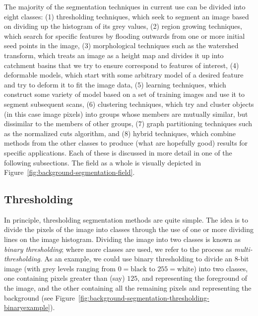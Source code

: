 The majority of the segmentation techniques in current use can be divided into eight classes: (1) thresholding techniques, which seek to segment an image based on dividing up the histogram of its grey values, (2) region growing techniques, which search for specific features by flooding outwards from one or more initial seed points in the image, (3) morphological techniques such as the watershed transform, which treats an image as a height map and divides it up into catchment basins that we try to ensure correspond to features of interest, (4) deformable models, which start with some arbitrary model of a desired feature and try to deform it to fit the image data, (5) learning techniques, which construct some variety of model based on a set of training images and use it to segment subsequent scans, (6) clustering techniques, which try and cluster objects (in this case image pixels) into groups whose members are mutually similar, but dissimilar to the members of other groups, (7) graph partitioning techniques such as the normalized cuts algorithm, and (8) hybrid techniques, which combine methods from the other classes to produce (what are hopefully good) results for specific applications. Each of these is discussed in more detail in one of the following subsections. The field as a whole is visually depicted in Figure~\ref{fig:background-segmentation-field}.


\subsection{Thresholding}

In principle, thresholding segmentation methods are quite simple. The idea is to divide the pixels of the image into classes through the use of one or more dividing lines on the image histogram. Dividing the image into two classes is known as \emph{binary thresholding}; where more classes are used, we refer to the process as \emph{multi-thresholding}. As an example, we could use binary thresholding to divide an 8-bit image (with grey levels ranging from $0 = \mbox{black}$ to $255 = \mbox{white}$) into two classes, one containing pixels greater than (say) $125$, and representing the foreground of the image, and the other containing all the remaining pixels and representing the background (see Figure~\ref{fig:background-segmentation-thresholding-binaryexample}).

